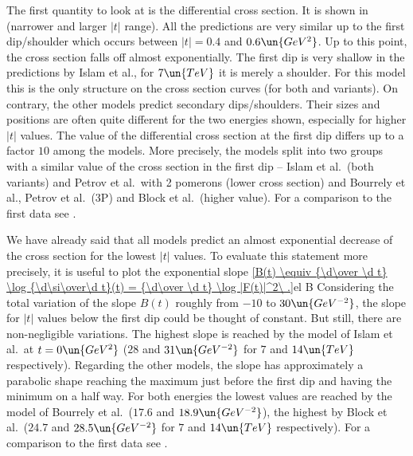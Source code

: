 The first quantity to look at is the differential cross section. It is shown in  (narrower and larger $|t|$ range). All the predictions are very similar up to the first dip/shoulder which occurs between $|t| = 0.4$ and $0.6\un{GeV^2}$. Up to this point, the cross section falls off almost exponentially. The first dip is very shallow in the predictions by Islam et al., for $7\un{TeV}$ it is merely a shoulder. For this model this is the only structure on the cross section curves (for both  and  variants). On contrary, the other models predict secondary dips/shoulders. Their sizes and positions are often quite different for the two energies shown, especially for higher $|t|$ values. The value of the differential cross section at the first dip differs up to a factor $10$ among the models. More precisely, the models split into two groups with a similar value of the cross section in the first dip -- Islam et al.\ (both variants) and Petrov et al.\ with 2 pomerons (lower cross section) and Bourrely et al., Petrov et al.\ (3P) and Block et al.\ (higher value). For a comparison to the first  data see .



We have already said that all models predict an almost exponential decrease of the cross section for the lowest $|t|$ values. To evaluate this statement more precisely, it is useful to plot the exponential slope
\eqref{B(t) \equiv {\d\over \d t} \log {\d\si\over\d t}(t) = {\d\over \d t} \log |F(t)|^2\ .}{el B}
Considering the total variation of the slope $B(t)$ roughly from $-10$ to $30\un{GeV^{-2}}$, the slope for $|t|$ values below the first dip could be thought of constant. But still, there are non-negligible variations. The highest slope is reached by the model of Islam et al.\ at $t=0\un{GeV^2}$ ($28$ and $31\un{GeV^{-2}}$ for $7$ and $14\un{TeV}$ respectively). Regarding the other models, the slope has approximately a parabolic shape reaching the maximum just before the first dip and having the minimum on a half way. For both energies the lowest values are reached by the model of Bourrely et al.\ ($17.6$ and $18.9\un{GeV^{-2}}$), the highest by Block et al.\ ($24.7$ and $28.5\un{GeV^{-2}}$ for $7$ and $14\un{TeV}$ respectively). For a comparison to the first  data see .

